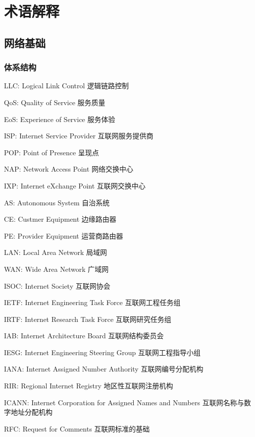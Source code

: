 \documentclass[UTF8,cs4size]{ctexart}
\begin{document}
\section{术语解释}
\subsection{网络基础}
\subsubsection{体系结构}
\begin{compactitem}
  \item LLC: Logical Link Control 逻辑链路控制
  \item QoS: Quality of Service 服务质量
  \item EoS: Experience of Service 服务体验
  \item ISP:  Internet Service Provider 互联网服务提供商
\end{compactitem}
\begin{compactitem}
  \item POP: Point of Presence 呈现点
  \item NAP: Network Access Point 网络交换中心
  \item IXP: Internet eXchange Point 互联网交换中心
  \item AS: Autonomous System 自治系统
  \item CE: Custmer Equipment 边缘路由器
  \item PE: Provider Equipment 运营商路由器
  \item LAN: Local Area Network 局域网
  \item WAN: Wide Area Network 广域网
\end{compactitem}
\begin{compactitem}
  \item ISOC: Internet Society 互联网协会
  \item IETF: Internet Engineering Task Force 互联网工程任务组
  \item IRTF: Internet Research Task Force 互联网研究任务组
  \item IAB: Internet Architecture Board 互联网结构委员会
  \item IESG: Internet Engineering Steering Group 互联网工程指导小组
  \item IANA: Internet Assigned Number Authority 互联网编号分配机构
  \item RIR: Regional Internet Registry 地区性互联网注册机构
  \item ICANN: Internet Corporation for Assigned Names and Numbers 互联网名称与数字地址分配机构
  \item RFC: Request for Comments 互联网标准的基础
\end{compactitem}
\end{document}
